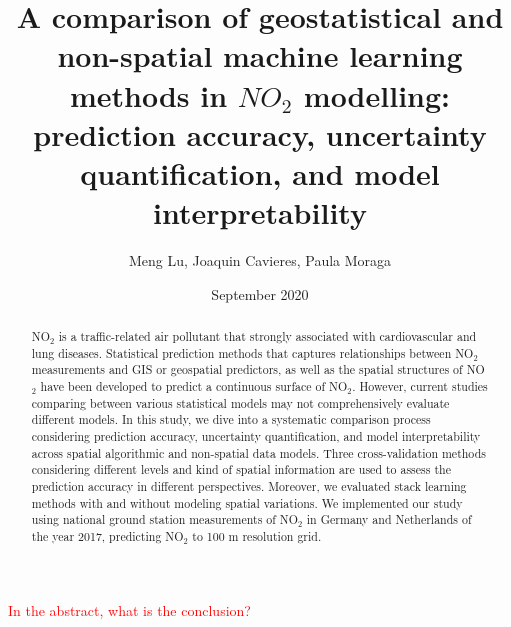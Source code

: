 \documentclass{article}
\author{Meng Lu, Joaquin Cavieres, Paula Moraga }
\date{September 2020}
\title{A comparison of geostatistical and non-spatial machine learning methods in $NO_2$ modelling: prediction accuracy, uncertainty quantification, and model interpretability }
\begin{document}
\maketitle
\begin{abstract} 
NO$_2$ is a traffic-related air pollutant that strongly associated with cardiovascular and lung diseases. Statistical prediction methods that captures relationships between NO$_2$ measurements and GIS or geospatial predictors, as well as the spatial structures of NO$_2$ have been developed to predict a continuous surface of NO$_2$. However, current studies comparing between various statistical models may not comprehensively evaluate different models. In this study, we dive into a systematic comparison process considering prediction accuracy, uncertainty quantification, and model interpretability across spatial algorithmic and non-spatial data models. Three cross-validation methods considering different levels and kind of spatial information are used to assess the prediction accuracy in different perspectives. Moreover, we evaluated stack learning methods with and without modeling spatial variations. We implemented our study using national ground station measurements of NO$_2$ in Germany and Netherlands of the year 2017, predicting NO$_2$ to 100 m resolution grid.   
\end{abstract}
 
\textcolor{red}{In the abstract, what is the conclusion?}
\end{document}

